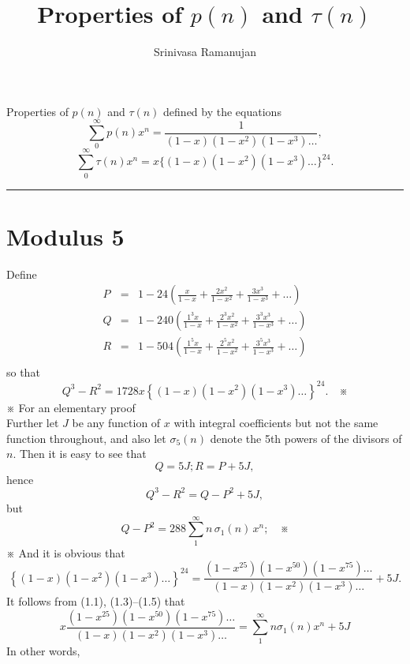 \documentclass[letterpaper]{article}
\title{Properties of $p(n)$ and $\tau(n)$}
\author{Srinivasa Ramanujan}
\date{}
\begin{document}
\maketitle

Properties of $p(n)$ and $\tau(n)$ defined by the equations 
\[\sum_0^\infty p(n)x^n=\frac{1}{(1-x)(1-x^2)(1-x^3)\dots}, \]
\[\sum_0^\infty \tau(n)x^n=x\{(1-x)(1-x^2)(1-x^3)\dots\}^{24}. \]
\hrule
\section{Modulus 5}
Define 
\[\begin{array}{rcl}
P &=& 1-24\left(\frac{x}{1-x}+\frac{2x^2}{1-x^2}+\frac{3x^3}{1-x^3}+\dots\right)\\
Q &=& 1-240\left(\frac{1^3x}{1-x}+\frac{2^3x^2}{1-x^2}+\frac{3^3x^3}{1-x^3}+\dots\right)\\
R &=& 1-504\left(\frac{1^5x}{1-x}+\frac{2^5x^2}{1-x^2}+\frac{3^5x^3}{1-x^3}+\dots\right)\\
\end{array}\]
so that 
\begin{equation}
Q^3-R^2=1728x\left\lbrace(1-x)(1-x^2)(1-x^3)\dots\right\rbrace^{24}. \quad 	\text{※}
\end{equation}
※ For an elementary proof\\
Further let $J$ be any function of $x$ with integral coefficients but not the same function throughout, and also let $\sigma_5(n)$ denote the 5th powers of the divisors of $n$. Then it is easy to see that
\begin{equation}
Q = 5J ; R = P+5J, 
\end{equation}
hence 
\begin{equation}
Q^3-R^2 = Q-P^2+5J,
\end{equation}
but 
\begin{equation}
Q-P^2 = 288\sum_1^\infty n\, \sigma_1(n)\, x^n ; \quad \text{※}
\end{equation}
※ And it is obvious that  
\begin{equation}
\left\lbrace(1-x)(1-x^2)(1-x^3)\dots\right\rbrace^{24}=\frac{(1-x^{25})(1-x^{50})(1-x^{75})\dots}{(1-x)(1-x^2)(1-x^3)\dots}+5J.
\end{equation}
It follows from (1.1), (1.3)--(1.5) that 
\begin{equation}
x\frac{(1-x^{25})(1-x^{50})(1-x^{75})\dots}{(1-x)(1-x^2)(1-x^3)\dots} = \sum_1^\infty n\sigma_1(n)x^n+5J
\end{equation}
In other words, 
\end{document}
